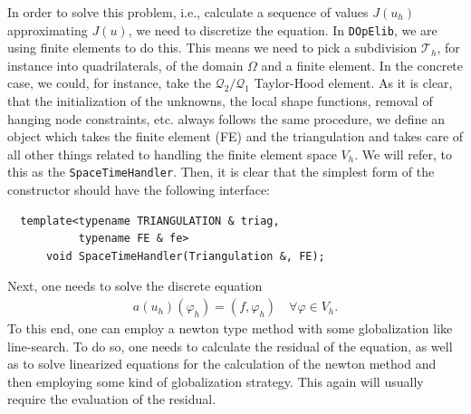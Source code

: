 \documentclass[smallextended]{svjour3}       %
\numberwithin{equation}{section}
\renewcommand{\phi}{\varphi}
\newcommand{\dope}{\texttt{DOpElib}}
\begin{document}
In order to solve this problem, i.e., calculate a sequence of values $J(u_h)$ approximating $J(u)$,
we need to discretize 
the equation. In \dope, we are using finite elements to do this. This means we need to pick a 
subdivision $\mathcal T_h$, for instance into quadrilaterals,
of the domain $\Omega$ and a finite element. In the concrete case, we could, 
for instance, take the $\mathcal Q_2/\mathcal Q_1$ Taylor-Hood element.
As it is clear, that the initialization of the unknowns, the local shape 
functions, removal of hanging node constraints, etc. always follows the 
same procedure, we define an object which takes the finite element (FE)
and the triangulation and takes care of all other things related to
handling the finite element space $V_h$. We will refer, to 
this as the \texttt{SpaceTimeHandler}. Then, it is clear that the simplest 
form of the constructor should have the following interface:
\begin{lstlisting}
  template<typename TRIANGULATION & triag, 
           typename FE & fe>
      void SpaceTimeHandler(Triangulation &, FE);
\end{lstlisting}
Next, one needs to solve the discrete equation
\begin{align}\label{eq:discrete_equation}
a(u_h)(\phi_h) = (f,\phi_h) \quad \forall \phi \in V_h.
\end{align}
To this end, one can employ a newton type method with some globalization 
like line-search. To do so, one needs to calculate the residual of the 
equation, as well as to solve linearized equations for the calculation of 
the newton method and then employing some kind of globalization strategy.
This again will usually require the evaluation of the residual.
\end{document}
